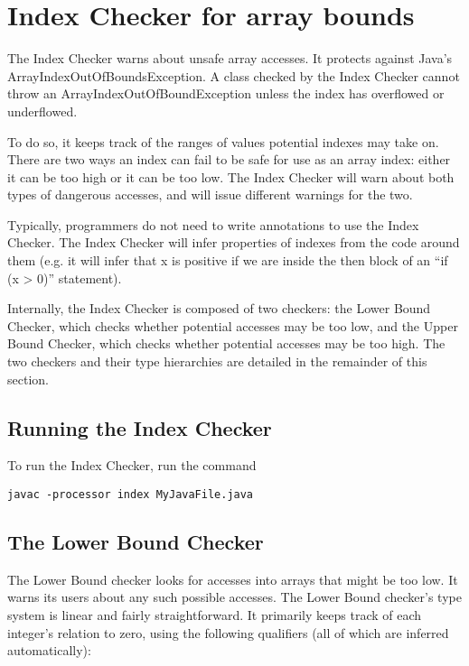 \chapter{Index Checker for array bounds\label{index-checker}}

The Index Checker warns about unsafe array accesses.  It protects
against Java's ArrayIndexOutOfBoundsException. A class checked by the
Index Checker cannot throw an ArrayIndexOutOfBoundException unless the
index has overflowed or underflowed.

To do so, it keeps track of the ranges of values potential indexes may
take on. There are two ways an index can fail to be safe for use as an
array index: either it can be too high or it can be too low. The Index
Checker will warn about both types of dangerous accesses, and will
issue different warnings for the two.

Typically, programmers do not need to write annotations to use the
Index Checker. The Index Checker will infer properties of indexes from
the code around them (e.g.  it will infer that x is positive if we are
inside the then block of an ``if (x > 0)'' statement).

Internally, the Index Checker is composed of two checkers: the Lower
Bound Checker, which checks whether potential accesses may be too low,
and the Upper Bound Checker, which checks whether potential accesses
may be too high. The two checkers and their type hierarchies are
detailed in the remainder of this section.

\section{Running the Index Checker\label{index-running}}

To run the Index Checker, run the command

\begin{Verbatim}
javac -processor index MyJavaFile.java
\end{Verbatim}


\section{The Lower Bound Checker\label{index-lowerbound}}

The Lower Bound checker looks for accesses into arrays that might be
too low.  It warns its users about any such possible accesses. The
Lower Bound checker's type system is linear and fairly
straightforward. It primarily keeps track of each integer's relation
to zero, using the following qualifiers (all of which are inferred
automatically):


